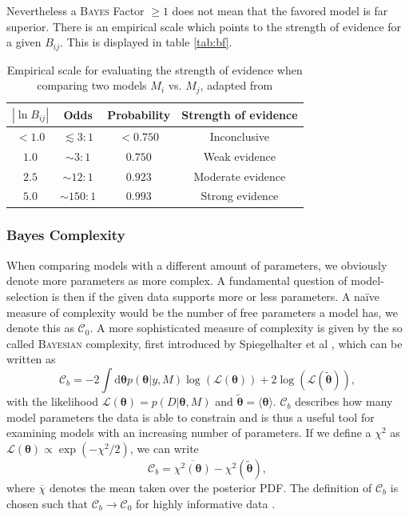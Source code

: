 \documentclass[%
 reprint,
 amsmath,amssymb,
 aps,
]{revtex4-1}
\begin{document}
Nevertheless a \textsc{Bayes} Factor $\geq1$ does not mean that the favored model is far superior. There is an empirical scale which points to the strength of evidence for a given $B_{ij}$. This is displayed in table \eqref{tab:bf}.


\begin{table}[htbp]

	\centering
	{\renewcommand{\arraystretch}{1.3}
	\begin{tabular}{|c|c|c|c|}
		\hline
		$|\ln B_{ij}|$& Odds & Probability & Strength of evidence \\
		\hline
		$< 1.0$& $ \lesssim 3:1$ & $< 0.750$  & Inconclusive  \\
		$1.0$ & $\sim 3:1$ & $0.750$ & Weak evidence  \\
		$2.5$& $\sim 12:1$ & $0.923$ & Moderate evidence \\
		$5.0$& $\sim 150:1$ & $0.993$ & Strong evidence \\
		\hline
	\end{tabular}}
\caption{Empirical scale for evaluating the strength of evidence when comparing two models $M_i$ vs. $M_j$, adapted from \cite{Trotta_2008}}
\label{tab:bf}
\end{table}


\subsubsection{\textbf{Bayes Complexity}}
When comparing models with a different amount of parameters, we obviously denote more parameters as more complex. A fundamental question of model-selection is then if the given data supports more or less parameters. A na\"ive measure of complexity would be the number of free parameters a model has, we denote this as $\mathcal{C}_0$. A more sophisticated measure of complexity is given by the so called \textsc{Bayesian} complexity, first introduced by Spiegelhalter et al \cite{Spiegelhalter}, which can be written as \cite{kunz} 
\begin{equation}\label{eq:Bayes_Complexity}
	\mathcal{C}_b=-2\int \text{d}\boldsymbol{\theta} p(\boldsymbol{\theta}|y,M)\log(\mathcal{L}(\boldsymbol{\theta}))+2\log(\mathcal{L}(\boldsymbol{\tilde{\theta}})),
\end{equation}
with  the likelihood $\mathcal{L}(\boldsymbol{\theta})=p(D|\boldsymbol{\theta},M)$ and $\boldsymbol{\tilde{\theta}}=\langle\boldsymbol{\theta}\rangle$. $\mathcal{C}_b$ describes how many model parameters the data is able to constrain \cite{kunz} and is thus a useful tool for examining models with an increasing number of parameters. If we define a $\chi^2$ as $\mathcal{L}(\boldsymbol{\theta})\propto \exp(-\chi^2/2)$, we can write 
\begin{equation}\label{eq:Bayes_Complexity_alt}
	\mathcal{C}_b=\overline{\chi^2(\boldsymbol{\theta})}-\chi^2(\boldsymbol{\tilde{\theta}}),
\end{equation}
where $\overline{\chi}$ denotes the mean taken over the posterior PDF. 
The definition of $\mathcal{C}_b$ is chosen such that $\mathcal{C}_b\to\mathcal{C}_0$ for highly informative data \cite{kunz}.
\end{document}
